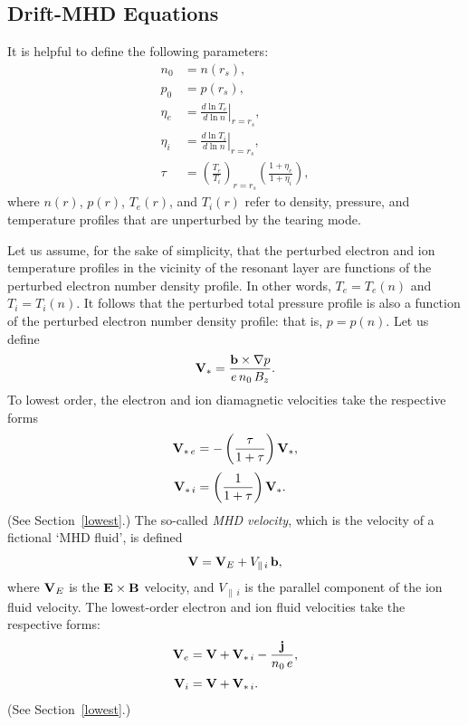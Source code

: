 \documentclass[notitlepage,12pt]{article}
\begin{document}
\subsection{Drift-MHD Equations}\label{s4.2}
 It is helpful to define
the following parameters:
\begin{align}
n_0 &= n(r_s),\\[0.5ex]
p_0&= p(r_s),\label{e210}\\[0.5ex]
\eta_e &=\left.\frac{d\ln T_e}{d\ln n}\right|_{r=r_s},\label{e211}\\[0.5ex]
\eta_i &= \left.\frac{d\ln T_i}{d\ln n}\right|_{r=r_s},\\[0.5ex]
\tau &= \left(\frac{T_e}{T_i}\right)_{r=r_s}\left(\frac{1+\eta_e}{1+\eta_i}\right),\label{e213}
\end{align}
where $n(r)$, $p(r)$, $T_e(r)$, and $T_i(r)$ refer to density, pressure, and temperature profiles that are unperturbed by the tearing mode. 

Let us assume, for the sake of simplicity, that the perturbed electron and ion temperature profiles in the vicinity of the resonant
layer are functions of the perturbed electron number density profile. In other words, $T_e=T_e(n)$ and $T_i=T_i(n)$. 
It follows that the perturbed total pressure profile is also a function of the perturbed electron number density profile: that is,
$p=p(n)$. Let us define
\begin{equation}
{\bf V}_\ast = \frac{{\bf b}\times \nabla p}{e\,n_0\,B_z}.
\end{equation}
To lowest order, the electron and ion diamagnetic velocities take the respective forms
\begin{align}
{\bf V}_{\ast\,e} &= -\left(\frac{\tau}{1+\tau}\right){\bf V}_\ast,\\[0.5ex]
{\bf V}_{\ast\,i} &= \left(\frac{1}{1+\tau}\right){\bf V}_\ast.
\end{align}
(See Section~\ref{lowest}.)
The so-called {\em MHD velocity}, which is the velocity of a fictional `MHD fluid',  is defined
\begin{equation}\label{e217}
{\bf V} = {\bf V}_E + V_{\parallel\,i}\,{\bf b},
\end{equation}
where ${\bf V}_E$ is the ${\bf E}\times {\bf B}$ velocity, and $V_{\parallel\,i}$ is the parallel component of the ion
fluid velocity. The lowest-order electron and ion fluid velocities take the respective forms:
\begin{align}
{\bf V}_e &= {\bf V} +{\bf V}_{\ast\,i}-\frac{{\bf j}}{n_0\,e},\\[0.5ex]
{\bf V}_i &= {\bf V} + {\bf V}_{\ast\,i}.\label{e219}
\end{align}
(See Section~\ref{lowest}.)
\end{document}
